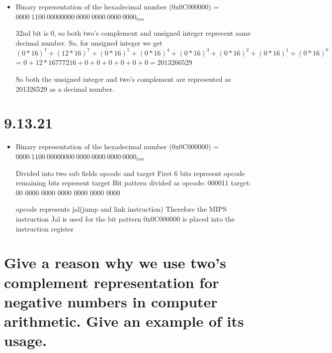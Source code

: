 \documentclass{article}
\begin{document}
\begin{itemize}
    \item Binary representation of the hexadecimal number (0x0C000000) = $0000\ 1100\ 0000 0000\ 0000\ 0000\ 0000\ 0000_{two}$ \newline
    
    32nd bit is 0, so both two's complement and unsigned integer represent same decimal number. So, for unsigned integer we get $(0*16)^7 + (12*16)^7 + (0*16)^5 + (0*16)^4 + (0*16)^3 + (0*16)^2 + (0*16)^1 + (0*16)^0$ = $0 + 12*16777216 + 0 + 0 + 0 + 0 + 0 + 0 = 2013266529$ \newline
    
    So both the unsigned integer and two's complement are represented as 201326529 as a decimal number. \newline
    
\end{itemize}

\section{9.13.21}
\large

\begin{itemize}
    \item Binary representation of the hexadecimal number (0x0C000000) = $0000\ 1100\ 0000 0000\ 0000\ 0000\ 0000\ 0000_{two}$ \newline
    
    Divided into two sub fields opcode and target\newline
    First 6 bits represent opcode remaining bits represent target\newline
    Bit pattern divided as\newline
    opcode: 000011\newline
    target: 00 0000 0000 0000 0000 0000 0000\newline
    
    opcode represents jal(jump and link instruction)\newline
    Therefore the MIPS instruction Jal is used for the bit pattern 0x0C000000 is placed into the instruction register \newline
    
\end{itemize}

\section{Give a reason why we use two’s complement representation for negative numbers in computer
arithmetic. Give an example of its usage.}
\large
\end{document}
